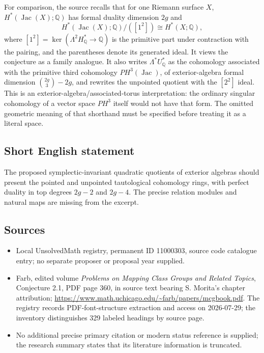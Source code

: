 \documentclass[11pt]{article}
\newcommand{\Q}{\mathbb{Q}}
\begin{document}
For comparison, the source recalls that for one Riemann surface $X$, $H^*(\operatorname{Jac}(X);\Q)$ has formal duality dimension $2g$ and
\[
 H^*(\operatorname{Jac}(X);\Q)/([1^2])\cong H^*(X;\Q),
\]
where $[1^2]=\ker(\Lambda^2H_{\Q}^*\to\Q)$ is the primitive part under contraction with the pairing, and the parentheses denote its generated ideal. It views the conjecture as a family analogue. It also writes $\Lambda^*U_{\Q}^*$ as the cohomology associated with the primitive third cohomology $PH^3(\operatorname{Jac})$, of exterior-algebra formal dimension $\binom{2g}{3}-2g$, and rewrites the unpointed quotient with the $[2^2]$ ideal. This is an exterior-algebra/associated-torus interpretation: the ordinary singular cohomology of a vector space $PH^3$ itself would not have that form. The omitted geometric meaning of that shorthand must be specified before treating it as a literal space.
\subsection{Short English statement}
The proposed symplectic-invariant quadratic quotients of exterior algebras should present the pointed and unpointed tautological cohomology rings, with perfect duality in top degrees $2g-2$ and $2g-4$. The precise relation modules and natural maps are missing from the excerpt.
\subsection{Sources}
\begin{itemize}
\item Local UnsolvedMath registry, permanent ID 11000303, source code catalogue entry; no separate proposer or proposal year supplied.
\item Farb, edited volume \emph{Problems on Mapping Class Groups and Related Topics}, Conjecture 2.1, PDF page 360, in source text bearing S. Morita's chapter attribution; \url{https://www.math.uchicago.edu/~farb/papers/mcgbook.pdf}. The registry records PDF-font-structure extraction and access on 2026-07-29; the inventory distinguishes 329 labeled headings by source page.
\item No additional precise primary citation or modern status reference is supplied; the research summary states that its literature information is truncated.
\end{itemize}
\end{document}
